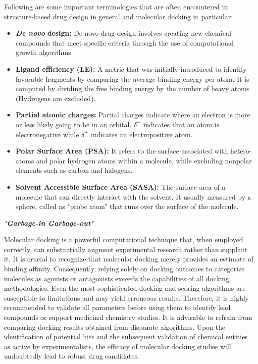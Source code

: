\documentclass[10pt, a4paper]{book}
\begin{document}
Following are some important terminologies that are often encountered in structure-based drug design in general and molecular docking in particular: 
\begin{itemize}
    \item \textbf{\textit{De novo} design:} De novo drug design involves creating new chemical compounds that meet specific criteria through the use of computational growth algorithms. 
    \item \textbf{Ligand efficiency (LE):} A metric that was initially introduced to identify favorable fragments by comparing the average binding energy per atom. It is computed by dividing the free binding energy by the number of heavy atoms (Hydrogens are excluded).
    \item \textbf{Partial atomic charges:} Partial charges indicate where an electron is more or less likely going to be in an orbital. $ \delta^-$ indicates that an atom is electronegative while $ \delta^+$ indicates an electropositive atom. 
    \item \textbf{Polar Surface Area (PSA):} It refers to the surface associated with hetero-atoms and polar hydrogen atoms within a molecule, while excluding nonpolar elements such as carbon and halogens. 
    \item \textbf{Solvent Accessible Surface Area (SASA):} The surface area of a molecule that can directly interact with the solvent. It usually measured by a sphere, called as "probe atom" that runs over the surface of the molecule. 
\end{itemize}


\textit{"\textbf{Garbage-in Garbage-out}"}

Molecular docking is a powerful computational technique that, when employed correctly, can substantially augment experimental research rather than supplant it. It is crucial to recognize that molecular docking merely provides an estimate of binding affinity. Consequently, relying solely on docking outcomes to categorize molecules as agonists or antagonists exceeds the capabilities of all docking methodologies. Even the most sophisticated docking and scoring algorithms are susceptible to limitations and may yield erroneous results. Therefore, it is highly recommended to validate all parameters before using them to identify lead compounds or support medicinal chemistry studies. It is advisable to refrain from comparing docking results obtained from disparate algorithms. Upon the identification of potential hits and the subsequent validation of chemical entities as active by experimentalists, the efficacy of molecular docking studies will undoubtedly lead to robust drug candidates. 



\end{document}
